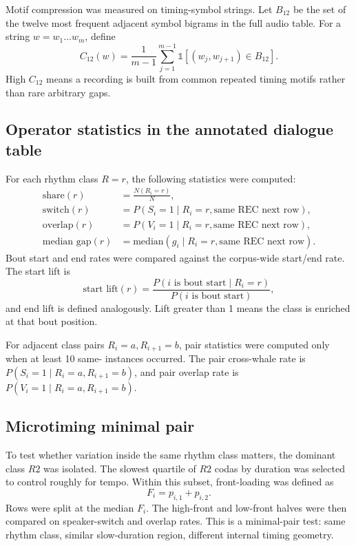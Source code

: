 \documentclass[11pt]{article}
\begin{document}
Motif compression was measured on timing-symbol strings. Let $B_{12}$ be the set of the twelve most frequent adjacent symbol bigrams in the full audio table. For a string $w=w_1\ldots w_m$, define
\begin{equation}
    C_{12}(w) = \frac{1}{m-1}\sum_{j=1}^{m-1}\mathbb{1}[(w_j,w_{j+1}) \in B_{12}].
\end{equation}
High $C_{12}$ means a recording is built from common repeated timing motifs rather than rare arbitrary gaps.

\subsection{Operator statistics in the annotated dialogue table}

For each rhythm class $R=r$, the following statistics were computed:
\begin{align}
    \text{share}(r) &= \frac{N(R_i=r)}{N}, \\
    \text{switch}(r) &= P(S_i=1 \mid R_i=r, \text{same REC next row}), \\
    \text{overlap}(r) &= P(V_i=1 \mid R_i=r, \text{same REC next row}), \\
    \text{median gap}(r) &= \mathrm{median}(g_i \mid R_i=r, \text{same REC next row}).
\end{align}
Bout start and end rates were compared against the corpus-wide start/end rate. The start lift is
\begin{equation}
    \text{start lift}(r)=\frac{P(i\text{ is bout start}\mid R_i=r)}{P(i\text{ is bout start})},
\end{equation}
and end lift is defined analogously. Lift greater than 1 means the class is enriched at that bout position.

For adjacent class pairs $R_i=a, R_{i+1}=b$, pair statistics were computed only when at least 10 same- instances occurred. The pair cross-whale rate is $P(S_i=1\mid R_i=a,R_{i+1}=b)$, and pair overlap rate is $P(V_i=1\mid R_i=a,R_{i+1}=b)$.

\subsection{Microtiming minimal pair}

To test whether variation inside the same rhythm class matters, the dominant class $R2$ was isolated. The slowest quartile of $R2$ codas by duration was selected to control roughly for tempo. Within this subset, front-loading was defined as
\begin{equation}
    F_i = p_{i,1}+p_{i,2}.
\end{equation}
Rows were split at the median $F_i$. The high-front and low-front halves were then compared on speaker-switch and overlap rates. This is a minimal-pair test: same rhythm class, similar slow-duration region, different internal timing geometry.
\end{document}
